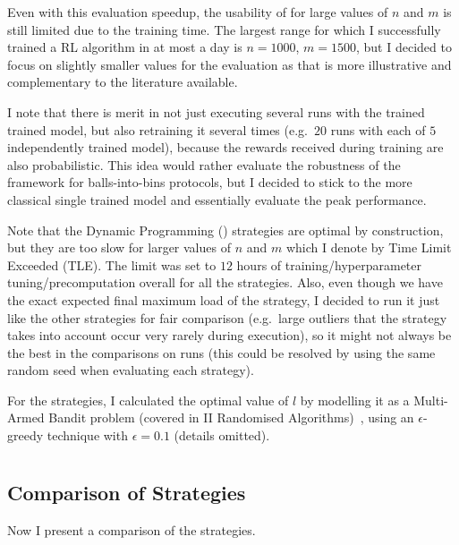 Even with this evaluation speedup, the usability of \DQL for large values of $n$ and $m$ is still limited due to the training time. The largest range for which I successfully trained a RL algorithm in at most a day is $n=1000$, $m=1500$, but I decided to focus on slightly smaller values for the evaluation as that is more illustrative and complementary to the literature available.  


I note that there is merit in not just executing several runs with the trained trained \DQL model, but also retraining it several times (e.g.\ $20$ runs with each of $5$ independently trained model), because the rewards received during training are also probabilistic. This idea would rather evaluate the robustness of the \DQL framework for balls-into-bins protocols, but I decided to stick to the more classical single trained model and essentially evaluate the peak performance.


Note that the Dynamic Programming (\DP) strategies are optimal by construction, but they are too slow for larger values of $n$ and $m$ which I denote by Time Limit Exceeded (TLE). The limit was set to $12$ hours of training/hyperparameter tuning/precomputation overall for all the strategies. Also, even though we have the exact expected final maximum load of the \DP strategy, I decided to run it just like the other strategies for fair comparison (e.g.\ large outliers that the \DP strategy takes into account occur very rarely during execution), so it might not always be the best in the comparisons on \NumberofRuns runs (this could be resolved by using the same random seed when evaluating each strategy).


For the \Threshold strategies, I calculated the optimal value of $l$ by modelling it as a Multi-Armed Bandit problem (covered in II Randomised Algorithms)~\cite{katehakis1987multiarmedbandit}, using an $\epsilon$-greedy technique with $\epsilon=0.1$ (details omitted).




\section{\TwoThinning}


\subsection{Comparison of Strategies}\label{two-thinning-comparison}

Now I present a comparison of the \TwoThinning strategies.


